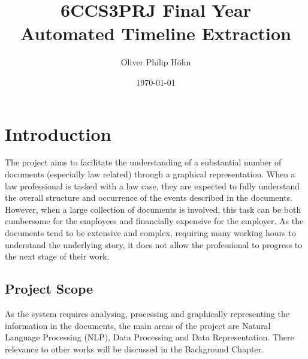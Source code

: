 \documentclass[11pt]{informatics-report}
\title{6CCS3PRJ Final Year\\\vspace{0.2cm}Automated Timeline Extraction}
\author{Oliver Philip H\"ohn}
\date{\today}
\begin{document}
\createFrontMatter
\onehalfspacing
\tableofcontents
\doublespacing


\chapter{Introduction}
\par The project aims to facilitate the understanding of a substantial number of documents (especially law related) through a graphical representation. When a law professional is tasked with a law case, they are expected to fully understand the overall structure and occurrence of the events described in the documents. However, when a large collection of documents is involved, this task can be both cumbersome for the employees and  financially expensive for the employer. As the documents tend to be extensive and complex, requiring many working hours to understand the underlying story, it does not allow the professional to progress to the next stage of their work.
\section{Project Scope}
\par As the system requires analysing, processing and graphically representing the information in the documents, the main areas of the project are Natural Language Processing (NLP), Data Processing and Data Representation. There relevance to other works will be discussed in the Background Chapter.
\end{document}
